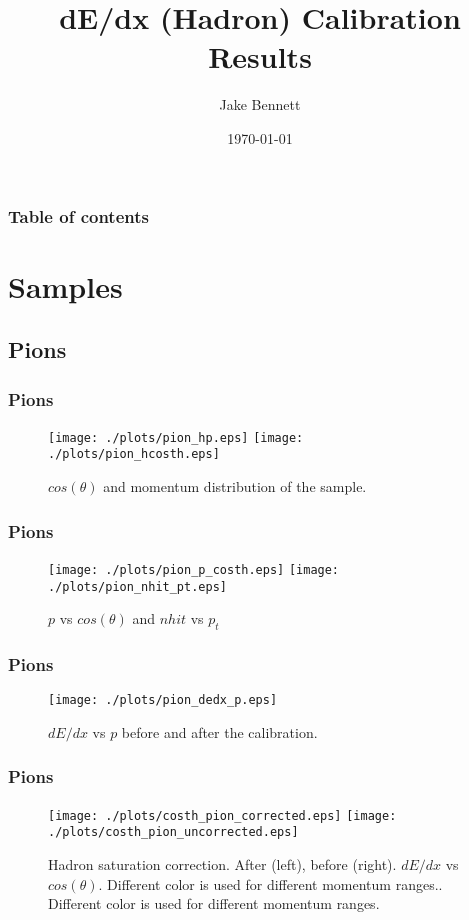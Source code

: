 \documentclass{beamer}
\begin{document}
\title{dE/dx (Hadron) Calibration Results}  
\author{Jake Bennett}
\date{\today} 

\begin{frame}
\titlepage
\end{frame}

\begin{frame}\frametitle{Table of contents}\tableofcontents
\end{frame} 


\section{Samples} 
\subsection{Pions}
\begin{frame}\frametitle{Pions}
\begin{figure}
\texttt{[image: ./plots/pion\_hp.eps]} 
\texttt{[image: ./plots/pion\_hcosth.eps]} 
\caption{$cos(\theta)$ and momentum distribution of the sample.}
\end{figure}
\end{frame}

\begin{frame}\frametitle{Pions}
\begin{figure}
\texttt{[image: ./plots/pion\_p\_costh.eps]} 
\texttt{[image: ./plots/pion\_nhit\_pt.eps]} 
\caption{$p$ vs $cos(\theta)$ and $nhit$ vs $p_{t}$}
\end{figure}
\end{frame}

\begin{frame}\frametitle{Pions}
\begin{figure}
\texttt{[image: ./plots/pion\_dedx\_p.eps]}
\caption{$dE/dx$ vs $p$ before and after the calibration.}
\end{figure}
\end{frame}

\begin{frame}\frametitle{Pions}
\begin{figure}
\texttt{[image: ./plots/costh\_pion\_corrected.eps]} 
\texttt{[image: ./plots/costh\_pion\_uncorrected.eps]} 
\caption{Hadron saturation correction. After (left), before (right). $dE/dx$ vs $cos(\theta)$. Different color is used for different momentum ranges.. Different color is used for different momentum ranges.}
\end{figure}
\end{frame}
\end{document}
